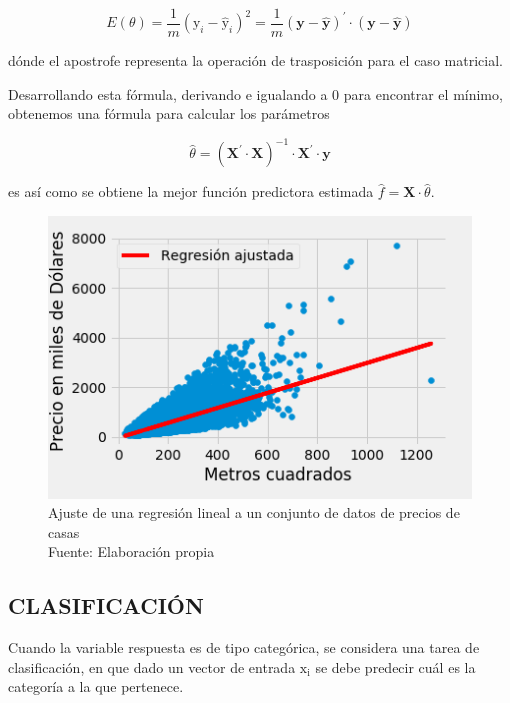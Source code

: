         \begin{equation}
            E(\theta) = \frac{1}{m} (\mathrm{y}_i - \mathrm{\hat{y}}_i)^2 = \frac{1}{m} (\mathbf{y} - \mathbf{\hat{y}})^\prime\cdot (\mathbf{y} - \mathbf{\hat{y}})
        \end{equation}
        
        \noindent dónde el apostrofe representa la operación de trasposición para el caso matricial.
        
        Desarrollando esta fórmula, derivando e igualando a 0 para encontrar el mínimo, obtenemos una fórmula para calcular los parámetros
        
        \begin{equation}
            \hat{\theta} = (\mathbf{X}^\prime\cdot\mathbf{X})^{-1}\cdot\mathbf{X}^\prime\cdot\mathbf{y}
        \end{equation}
        
        \noindent es así como se obtiene la mejor función predictora estimada $\hat{f} = \mathbf{X}\cdot\hat{\theta}$.
        
        \begin{figure}[H]
            \centering
            \includegraphics[scale=0.5]{imagenes/linear_fit}
            \caption{Ajuste de una regresión lineal a un conjunto de datos de precios de casas\\ Fuente: Elaboración propia}
        \end{figure}
    \subsection{CLASIFICACIÓN}
        Cuando la variable respuesta es de tipo categórica, se considera una tarea de clasificación, en que dado un vector de entrada $\mathrm{x_i}$ se debe predecir cuál es la categoría a la que pertenece. \citep{hastie01statisticallearning}
